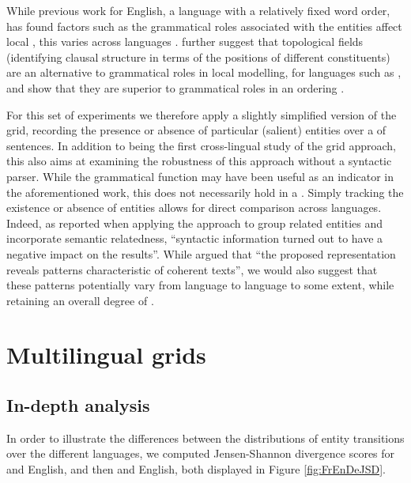 \documentclass[output=paper]{langsci/langscibook.cls}
\begin{document}
While previous work for English, a language with a relatively fixed word order, has found
factors such as the grammatical roles associated with the entities affect local , this varies across languages \citep{Cheung}.
\citet{Cheung} further suggest that
topological fields (identifying clausal structure in terms of the positions of different constituents) are an alternative to grammatical roles in local  modelling, for languages such as , and show that they are superior to grammatical roles in an ordering .

 For this set of experiments we therefore apply a slightly simplified version of the grid, recording the presence or absence of particular (salient) entities over a  of sentences. In addition to being the first cross-lingual study of the grid approach, this  also aims at examining the robustness of this approach without a syntactic parser. While the grammatical function may have been useful as an indicator in the aforementioned work, this does not necessarily hold in a . 
Simply tracking the existence or absence of entities allows for direct comparison across languages. Indeed, as \citet{Filippova:2007} reported when applying the  approach to group related entities and incorporate semantic relatedness, ``syntactic information turned out to have a negative impact on the results''. 
While \citet{Barzilay:2008} argued  that ``the proposed representation reveals  patterns characteristic of coherent texts'', we would also suggest that these patterns potentially vary from language to language to some extent, while retaining an overall degree of . 

\section{Multilingual grids}\label{multigrids}

\subsection{In-depth analysis}

In order to illustrate the differences between the distributions of entity transitions over the different languages, we computed Jensen-Shannon divergence scores for  and English, and then  and English, both displayed in Figure \ref{fig:FrEnDeJSD}. 
\end{document}
